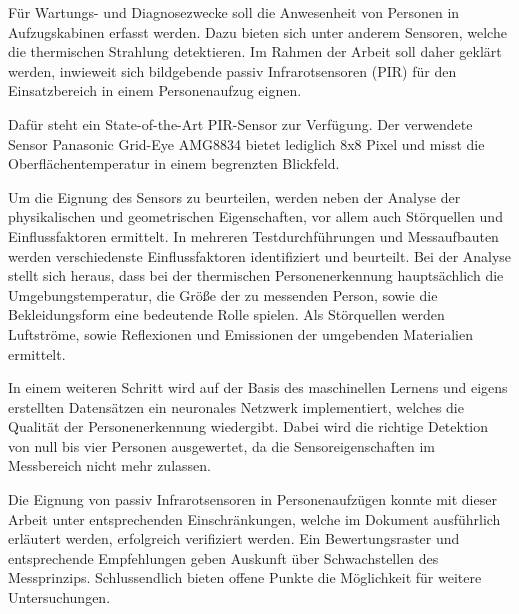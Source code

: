 Für Wartungs- und Diagnosezwecke soll die Anwesenheit von Personen in Aufzugskabinen erfasst werden. Dazu bieten sich unter anderem Sensoren, welche die thermischen Strahlung detektieren. Im Rahmen der Arbeit soll daher geklärt werden, inwieweit sich bildgebende passiv Infrarotsensoren (PIR) für den Einsatzbereich in einem Personenaufzug eignen. 

Dafür steht ein State-of-the-Art PIR-Sensor zur Verfügung. Der verwendete Sensor Panasonic Grid-Eye AMG8834 bietet lediglich 8x8 Pixel und misst die Oberflächentemperatur in einem begrenzten Blickfeld.  

Um die Eignung des Sensors zu beurteilen, werden neben der Analyse der physikalischen und geometrischen Eigenschaften, vor allem auch Störquellen und Einflussfaktoren ermittelt. In mehreren Testdurchführungen und Messaufbauten werden verschiedenste Einflussfaktoren identifiziert und beurteilt. Bei der Analyse stellt sich heraus, dass bei der thermischen Personenerkennung hauptsächlich die Umgebungstemperatur, die Größe der zu messenden Person, sowie die Bekleidungsform eine bedeutende Rolle spielen. Als Störquellen werden Luftströme, sowie Reflexionen und Emissionen der umgebenden Materialien ermittelt.  

In einem weiteren Schritt wird auf der Basis des maschinellen Lernens und eigens erstellten Datensätzen ein neuronales Netzwerk implementiert, welches die Qualität der Personenerkennung wiedergibt. Dabei wird die richtige Detektion von null bis vier Personen ausgewertet, da die Sensoreigenschaften im Messbereich nicht mehr zulassen. 

Die Eignung von passiv Infrarotsensoren in Personenaufzügen konnte mit dieser Arbeit unter entsprechenden Einschränkungen, welche im Dokument ausführlich erläutert werden, erfolgreich verifiziert werden.
Ein Bewertungsraster und entsprechende Empfehlungen geben Auskunft über Schwachstellen des Messprinzips. Schlussendlich bieten offene Punkte die Möglichkeit für weitere Untersuchungen.   



